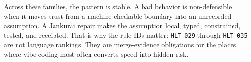 Across these families, the pattern is stable. A bad behavior is non-defensible when it moves trust from a machine-checkable boundary into an unrecorded assumption. A Jankurai repair makes the assumption local, typed, constrained, tested, and receipted. That is why the rule IDs matter: \texttt{HLT-029} through \texttt{HLT-035} are not language rankings. They are merge-evidence obligations for the places where vibe coding most often converts speed into hidden risk.
